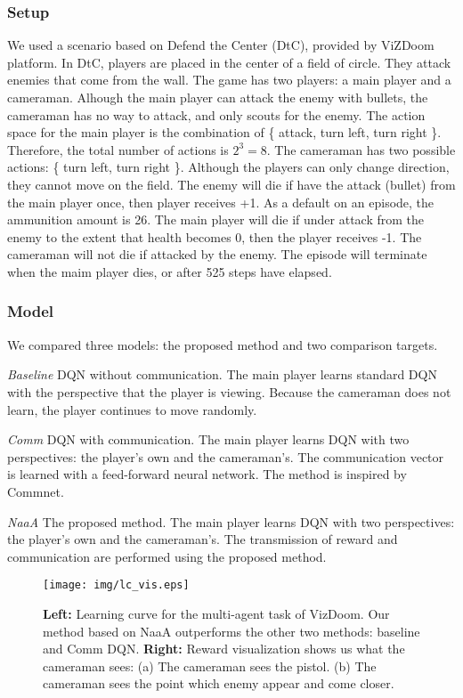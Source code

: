 \subsubsection{Setup}
We used a scenario based on Defend the Center (DtC), provided by ViZDoom platform.
In DtC, players are placed in the center of a field of circle. They attack enemies that come from the wall.
The game has two players: a main player and a cameraman.
Alhough the main player can attack the enemy with bullets, 
the cameraman has no way to attack, and only scouts for the enemy.
The action space for the main player is the combination of \{ attack, turn left, turn right \}. Therefore, the total number of actions is $2^3 = 8$.
The cameraman has two possible actions: \{ turn left, turn right \}.
Although the players can only change direction, they cannot move on the field.
The enemy will die if have the attack (bullet) from the main player once, then player receives +1.
As a default on an episode, the ammunition amount is 26.
The main player will die if under attack from the enemy to the extent that health becomes 0, then the player receives -1.
The cameraman will not die if attacked by the enemy.
The episode will terminate when the maim player dies, or after 525 steps have elapsed.

\subsubsection{Model}
We compared three models: the proposed method and two comparison targets.

{\em Baseline} DQN without communication. The main player learns standard DQN with the perspective that the player is viewing.
Because the cameraman does not learn, the player continues to move randomly.

{\em Comm} DQN with communication. The main player learns DQN with two perspectives: the player's own and the cameraman's.
The communication vector is learned with a feed-forward neural network. The method is inspired by Commnet.

{\em NaaA} The proposed method. The main player learns DQN with two perspectives: the player's own and the cameraman's.
The transmission of reward and communication are performed using the proposed method.

\begin{figure*}[t]
\centering
\texttt{[image: img/lc\_vis.eps]}
\caption{
	\textbf{Left:}
		Learning curve for the multi-agent task of VizDoom. 
		Our method based on NaaA outperforms the other two methods: baseline and Comm DQN.
	\textbf{Right:} 
		Reward visualization shows us what the cameraman sees:
		(a) The cameraman sees the pistol.
		(b) The cameraman sees the point which enemy appear and come closer.
}
\label{fig:lc_vis}
\end{figure*}

